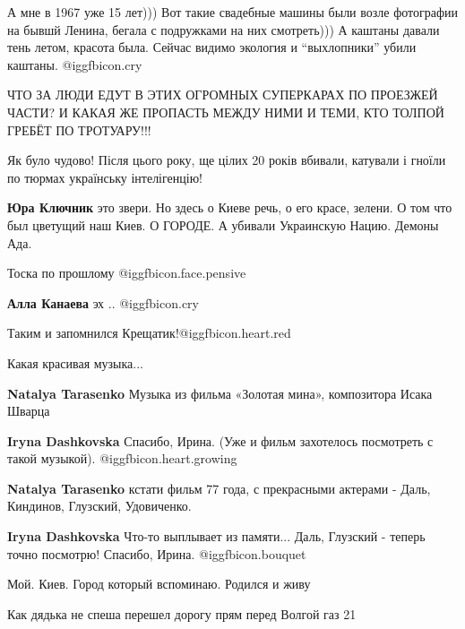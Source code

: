 \begin{itemize}

А мне в 1967 уже 15 лет))) Вот такие свадебные машины были возле фотографии на
бывшй Ленина, бегала с подружками на них смотреть))) А каштаны давали тень
летом, красота была. Сейчас видимо экология и \enquote{выхлопники} убили каштаны. @igg{fbicon.cry} 


ЧТО ЗА ЛЮДИ ЕДУТ В ЭТИХ ОГРОМНЫХ СУПЕРКАРАХ ПО ПРОЕЗЖЕЙ ЧАСТИ?
И КАКАЯ ЖЕ ПРОПАСТЬ МЕЖДУ НИМИ И ТЕМИ, КТО ТОЛПОЙ ГРЕБЁТ ПО ТРОТУАРУ!!!

Як було чудово! Після цього року, ще цілих 20 років вбивали, катували і гноїли
по тюрмах українську інтелігенцію!

\begin{itemize} %
\textbf{Юра Ключник} это звери. Но здесь о Киеве речь, о его красе, зелени. О том что был цветущий наш Киев. О ГОРОДЕ. А убивали Украинскую Нацию. Демоны Ада.
\end{itemize} %

Тоска по прошлому @igg{fbicon.face.pensive} 

\textbf{Алла Канаева} эх .. @igg{fbicon.cry} 

Таким и запомнился Крещатик!@igg{fbicon.heart.red}

Какая красивая музыка...

\begin{itemize} %
\textbf{Natalya Tarasenko} Музыка из фильма «Золотая мина», композитора Исака Шварца

\textbf{Iryna Dashkovska} Спасибо, Ирина. (Уже и фильм захотелось посмотреть с такой музыкой).  @igg{fbicon.heart.growing} 

\textbf{Natalya Tarasenko} кстати фильм 77 года, с прекрасными актерами - Даль, Киндинов, Глузский, Удовиченко.

\textbf{Iryna Dashkovska} Что-то выплывает из памяти... Даль, Глузский - теперь точно посмотрю! Спасибо, Ирина. @igg{fbicon.bouquet} 
\end{itemize} %

Мой. Киев. Город который вспоминаю. Родился и живу

Как дядька не спеша перешел дорогу прям перед Волгой газ 21


\end{itemize}

